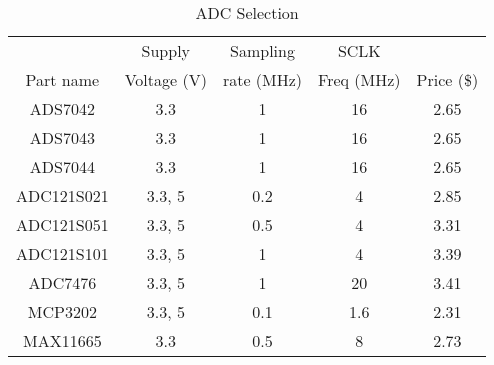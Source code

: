 \begin{table}[H]
	\centering
	\caption{ADC Selection}
	
	\begin{tabular}{|c|c|c|c|c|}
		\hline
		& Supply & Sampling & SCLK & \\
		Part name & Voltage (V) & rate (MHz) & Freq (MHz) & Price (\$) \\
		\hline
		ADS7042 & 3.3 & 1 & 16 & 2.65 \\
		
		ADS7043 & 3.3 & 1 & 16 & 2.65 \\
		
		ADS7044 & 3.3 & 1 & 16 & 2.65 \\
		
		ADC121S021 & 3.3, 5 & 0.2 & 4 & 2.85 \\
		
		ADC121S051 & 3.3, 5 & 0.5 & 4 & 3.31 \\
		
		ADC121S101 & 3.3, 5 & 1 & 4 & 3.39 \\
		
		ADC7476 & 3.3, 5 & 1 & 20 & 3.41 \\
		
		MCP3202 & 3.3, 5 & 0.1 & 1.6 & 2.31 \\
		
		MAX11665 & 3.3 & 0.5 & 8 & 2.73 \\
		\hline
	\end{tabular}
	
	\label{tbl:ADC Selection}
\end{table}

